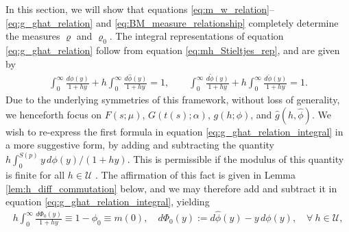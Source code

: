 \documentclass[english,12pt,jmp,graphicx]{revtex4-1}
\newcommand{\ph}{\hat{\phi}}
\newcommand{\pt}{\tilde{\phi}}
\newcommand{\pc}{\check{\phi}}
\begin{document}
In this section, we will show that equations
\eqref{eq:m_w_relation}--\eqref{eq:g_ghat_relation} and 
\eqref{eq:BM_measure_relationship} completely determine the measures
$\varrho$ and $\varrho_0$. The integral representations of equation
\eqref{eq:g_ghat_relation} follow from equation
\eqref{eq:mh_Stieltjes_rep}, and are given by  
%
\begin{align}\label{eq:g_ghat_relation_integral}
  \int_0^\infty\frac{d\phi(y)}{1+hy}+h\int_0^\infty\frac{d\ph(y)}{1+hy}=1,\qquad
  \int_0^\infty\frac{d\pt(y)}{1+hy}+h\int_0^\infty\frac{d\pc(y)}{1+hy}=1.
\end{align}
%
Due to the underlying symmetries of this framework, without loss of
generality, we henceforth focus on $F(s;\mu)$, $G(t(s);\alpha)$, $g(h;\phi)$,
and $\hat{g}(h,\ph)$. We wish to re-express the first formula in
equation \eqref{eq:g_ghat_relation_integral} in a more suggestive form,
by adding and subtracting the quantity
$h\int_0^{S(p)}y\,d\phi(y)/(1+hy)$. This is permissible if the modulus of
this quantity is finite for all $h\in\mathcal{U}$
\cite{Rudin:87,Folland:95}. The affirmation of this fact is given in 
Lemma \ref{lem:h_diff_commutation} below, and we may therefore add and
subtract it in equation \eqref{eq:g_ghat_relation_integral}, yielding   
%
%
\begin{align}\label{eq:n=0_measure_equivalence}
 h \int_0^\infty\frac{d\Phi_0(y)}{1+hy}\equiv1-\phi_0\equiv m(0),  \quad
 d\Phi_0(y):=d\ph(y)-y\,d\phi(y), \quad
 \forall \ h\in\mathcal{U},
\end{align}
\end{document}
